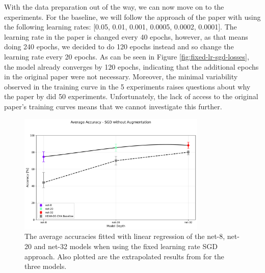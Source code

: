 \documentclass[logo,bsc,singlespacing,parskip,online]{infthesis}
\begin{document}
With the data preparation out of the way, we can now move on to the experiments.
For the baseline, we will follow the approach of the paper with using the following 
learning rates: [0.05, 0.01, 0.001, 0.0005, 0.0002, 0.0001].
The learning rate in the paper is changed every 40 epochs, however, as that means doing 
240 epochs, we decided to do 120 epochs instead and so change the learning rate every 20 epochs.
As can be seen in Figure \ref{fig:fixed-lr-sgd-losses}, the model already converges by 120 epochs,
indicating that the additional epochs in the original paper were not necessary. 
Moreover, the minimal variability observed in the training curve in the 5 experiments 
raises questions about why the paper by \citet{Huwel2020HearDS} did 50 experiments. Unfortunately,
the lack of access to the original paper's training curves means that we cannot investigate this further. 

\begin{figure}[h]
   \centering
   \includegraphics[width=0.8\textwidth]{average_accuracies_sgd_no_aug.png}
   \caption{The average accuracies fitted with linear regression of the net-8, net-20 and net-32 models when using the fixed learning rate SGD approach.
   Also plotted are the extrapolated results from \citet{Huwel2020HearDS} for the three models.
   }
   \label{fig:fixed-lr-sgd-accuracies}
\end{figure}
\end{document}
